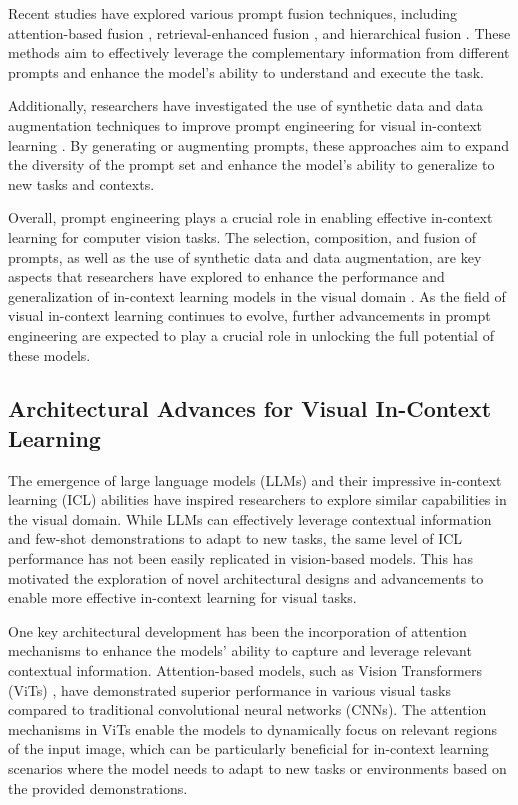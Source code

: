 \documentclass[11pt]{article}
\begin{document}
Recent studies have explored various prompt fusion techniques, including attention-based fusion \cite{ref148}, retrieval-enhanced fusion \cite{ref237}, and hierarchical fusion \cite{ref238}. These methods aim to effectively leverage the complementary information from different prompts and enhance the model's ability to understand and execute the task.

Additionally, researchers have investigated the use of synthetic data and data augmentation techniques to improve prompt engineering for visual in-context learning \cite{ref233}. By generating or augmenting prompts, these approaches aim to expand the diversity of the prompt set and enhance the model's ability to generalize to new tasks and contexts.

Overall, prompt engineering plays a crucial role in enabling effective in-context learning for computer vision tasks. The selection, composition, and fusion of prompts, as well as the use of synthetic data and data augmentation, are key aspects that researchers have explored to enhance the performance and generalization of in-context learning models in the visual domain \cite{ref233}. As the field of visual in-context learning continues to evolve, further advancements in prompt engineering are expected to play a crucial role in unlocking the full potential of these models.

\subsection{Architectural Advances for Visual In-Context Learning}

The emergence of large language models (LLMs) \cite{ref239} and their impressive in-context learning (ICL) abilities have inspired researchers to explore similar capabilities in the visual domain. While LLMs can effectively leverage contextual information and few-shot demonstrations to adapt to new tasks, the same level of ICL performance has not been easily replicated in vision-based models. This has motivated the exploration of novel architectural designs and advancements to enable more effective in-context learning for visual tasks.

One key architectural development has been the incorporation of attention mechanisms to enhance the models' ability to capture and leverage relevant contextual information. Attention-based models, such as Vision Transformers (ViTs) \cite{ref240}, have demonstrated superior performance in various visual tasks compared to traditional convolutional neural networks (CNNs). The attention mechanisms in ViTs enable the models to dynamically focus on relevant regions of the input image, which can be particularly beneficial for in-context learning scenarios where the model needs to adapt to new tasks or environments based on the provided demonstrations.
\end{document}
